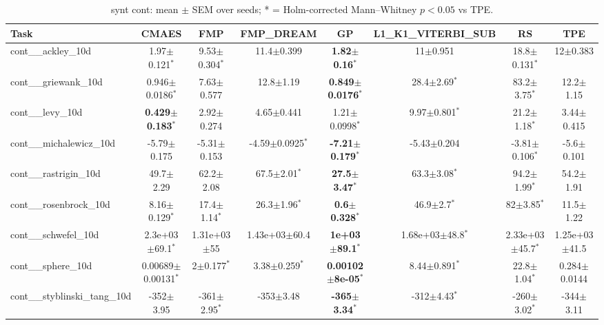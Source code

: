 \begin{table}[t]
\caption{synt cont: mean $\pm$ SEM over seeds; * = Holm-corrected Mann--Whitney $p<0.05$ vs TPE.}
\label{tab:synt_cont}
\begin{center}\small
\begin{tabular}{lccccccc}
\hline
Task & CMAES & FMP & FMP\_DREAM & GP & L1\_K1\_VITERBI\_SUB & RS & TPE \\
\hline
cont\_\_ackley\_10d & 1.97$\pm$0.121$^{*}$ & 9.53$\pm$0.304$^{*}$ & 11.4$\pm$0.399 & \textbf{1.82$\pm$0.16}$^{*}$ & 11$\pm$0.951 & 18.8$\pm$0.131$^{*}$ & 12$\pm$0.383 \\
cont\_\_griewank\_10d & 0.946$\pm$0.0186$^{*}$ & 7.63$\pm$0.577 & 12.8$\pm$1.19 & \textbf{0.849$\pm$0.0176}$^{*}$ & 28.4$\pm$2.69$^{*}$ & 83.2$\pm$3.75$^{*}$ & 12.2$\pm$1.15 \\
cont\_\_levy\_10d & \textbf{0.429$\pm$0.183}$^{*}$ & 2.92$\pm$0.274 & 4.65$\pm$0.441 & 1.21$\pm$0.0998$^{*}$ & 9.97$\pm$0.801$^{*}$ & 21.2$\pm$1.18$^{*}$ & 3.44$\pm$0.415 \\
cont\_\_michalewicz\_10d & -5.79$\pm$0.175 & -5.31$\pm$0.153 & -4.59$\pm$0.0925$^{*}$ & \textbf{-7.21$\pm$0.179}$^{*}$ & -5.43$\pm$0.204 & -3.81$\pm$0.106$^{*}$ & -5.6$\pm$0.101 \\
cont\_\_rastrigin\_10d & 49.7$\pm$2.29 & 62.2$\pm$2.08 & 67.5$\pm$2.01$^{*}$ & \textbf{27.5$\pm$3.47}$^{*}$ & 63.3$\pm$3.08$^{*}$ & 94.2$\pm$1.99$^{*}$ & 54.2$\pm$1.91 \\
cont\_\_rosenbrock\_10d & 8.16$\pm$0.129$^{*}$ & 17.4$\pm$1.14$^{*}$ & 26.3$\pm$1.96$^{*}$ & \textbf{0.6$\pm$0.328}$^{*}$ & 46.9$\pm$2.7$^{*}$ & 82$\pm$3.85$^{*}$ & 11.5$\pm$1.22 \\
cont\_\_schwefel\_10d & 2.3e+03$\pm$69.1$^{*}$ & 1.31e+03$\pm$55 & 1.43e+03$\pm$60.4 & \textbf{1e+03$\pm$89.1}$^{*}$ & 1.68e+03$\pm$48.8$^{*}$ & 2.33e+03$\pm$45.7$^{*}$ & 1.25e+03$\pm$41.5 \\
cont\_\_sphere\_10d & 0.00689$\pm$0.00131$^{*}$ & 2$\pm$0.177$^{*}$ & 3.38$\pm$0.259$^{*}$ & \textbf{0.00102$\pm$8e-05}$^{*}$ & 8.44$\pm$0.891$^{*}$ & 22.8$\pm$1.04$^{*}$ & 0.284$\pm$0.0144 \\
cont\_\_styblinski\_tang\_10d & -352$\pm$3.95 & -361$\pm$2.95$^{*}$ & -353$\pm$3.48 & \textbf{-365$\pm$3.34}$^{*}$ & -312$\pm$4.43$^{*}$ & -260$\pm$3.02$^{*}$ & -344$\pm$3.11 \\
\hline
\end{tabular}
\end{center}
\end{table}